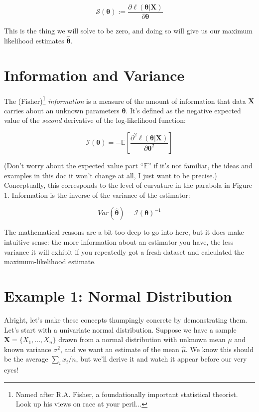 \documentclass{article}
\begin{document}
\begin{equation}
\mathcal{S}(\boldsymbol{\theta}) := \frac{\partial \ell(\boldsymbol{\theta}|\mathbf{X})}{\partial \mathbf{\theta}}
\end{equation}

This is the thing we will solve to be zero, and doing so will give us our maximum likelihood estimates $\hat{\boldsymbol{\theta}}$.

\section{Information and Variance}

The (Fisher)\footnote{Named after R.A. Fisher, a foundationally important statistical theorist. Look up his views on race at your peril...} \textit{information} is a measure of the amount of information that data $\mathbf{X}$ carries about an unknown parameters
$\boldsymbol{\theta}$. It's defined as the negative expected value of the \textit{second} derivative of the log-likelihood function:

\begin{equation}
\mathcal{I}(\boldsymbol{\theta}) = -\mathbb{E}\left[\frac{\partial^2 \ell(\boldsymbol{\theta}|\mathbf{X})}{\partial \boldsymbol{\theta}^2}\right]
\end{equation}

(Don't worry about the expected value part ``$\mathbb{E}$'' if it's not familiar, the ideas and examples in this doc it won't change at all, I just want to be precise.) Conceptually, this corresponds to the level of curvature in the parabola in Figure 1. Information is the inverse of the variance of the estimator:

\begin{equation}
Var(\hat{\boldsymbol{\theta}}) = \mathcal{I}(\boldsymbol{\theta})^{-1}
\end{equation}

The mathematical reasons are a bit too deep to go into here, but it does make intuitive sense: the more information about an estimator you have, the less variance it will exhibit if you repeatedly got a fresh dataset and calculated the maximum-likelihood estimate.

\section{Example 1: Normal Distribution}

Alright, let's make these concepts thumpingly concrete by demonstrating them. Let's start with a univariate normal distribution. Suppose we have a sample $\mathbf{X}=\{X_1, ..., X_n\}$ drawn from a normal distribution with unknown mean $\mu$ and known variance $\sigma^2$, and we want an estimate of the mean $\hat{\mu}$. We know this should be the average $\sum_i x_i / n$, but we'll derive it and watch it appear before our very eyes! 
\end{document}
